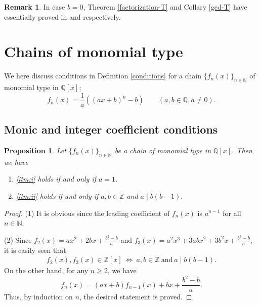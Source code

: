 \documentclass[a4paper, 11pt]{amsart}
\numberwithin{equation}{section}
\newtheorem{prop}[thm]{Proposition}
\theoremstyle{definition}
\newtheorem{rmk}[thm]{Remark}
\newcommand{\Z}{\mathbb{Z}}
\newcommand{\N}{\mathbb{N}}
\newcommand{\Q}{\mathbb{Q}}
\begin{document}
\begin{rmk}
In case $b=0$, Theorem \ref{factorization-T} and Collary \ref{gcd-T} have essentially proved in \cite{H} and \cite{RTW} respectively.
\end{rmk}


















\section{Chains of monomial type}

We here discuss conditions in Definition \ref{conditions} for a chain $\{f_n(x)\}_{n \in \N}$ of monomial type in $\Q[x]$; 
$$
f_n(x) = \frac{1}{a} ((ax + b)^n - b)\qquad (a, b\in \Q, a\neq 0).
$$ 




\subsection{Monic and integer coefficient conditions}

\begin{prop}\label{Z[x]}
Let $\{f_n(x)\}_{n \in \N}$ be a chain of monomial type in $\Q[x]$.
Then we have
\begin{enumerate}[{\rm (1)}]
\item
\ref{itm:i} holds if and only if $a = 1$.

\item \ref{itm:ii} holds if and only if $a, b \in \Z$ and  $a\mid b(b - 1).$ 
\end{enumerate}
\end{prop}

\begin{proof}
(1)
It is obvious since the leading coefficient of $f_n(x)$ is $a^{n-1}$ for all $n \in \N$.  

(2)
Since $f_2(x) = ax^2 + 2bx + \frac{b^2 - b}{a}$ and $f_3(x) = a^2x^3 + 3abx^2 + 3b^2x + \frac{b^3- b}{a}$, it is easily seen that
\begin{align*}
f_2(x), f_3(x)\in \Z[x] \ \iff \ a, b \in \Z \ \text{and}\ a \mid b(b-1).
\end{align*}
On the other hand, for any $n\geq 2$, we have
\[
f_n(x)=(ax+b)f_{n-1}(x)+bx+\frac{b^2-b}a.
\]
Thus, by induction on $n$, the desired statement is proved.
\end{proof}
\end{document}

